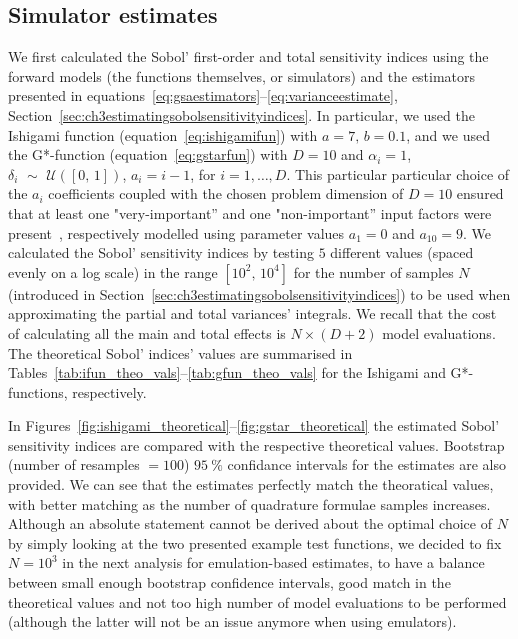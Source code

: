 \subsection{Simulator estimates}
We first calculated the Sobol' first-order and total sensitivity indices using the forward models (the functions themselves, or simulators) and the estimators presented in equations~\eqref{eq:gsaestimators}--\eqref{eq:varianceestimate}, Section~\ref{sec:ch3estimatingsobolsensitivityindices}. In particular, we used the Ishigami function (equation~\eqref{eq:ishigamifun}) with $a=7,\,b=0.1$, and we used the G*-function (equation~\eqref{eq:gstarfun}) with $D=10$ and $\alpha_i=1$, $\delta_i\,\,\sim\,\,\mathcal{U}([0,\,1])$, $a_i=i-1$, for $i=1,\dots,D$. This particular particular choice of the $a_i$ coefficients coupled with the chosen problem dimension of $D=10$ ensured that at least one "very-important'' and one "non-important'' input factors were present~\cite{Saltelli:2010,Marrel:2008}, respectively modelled using parameter values $a_1=0$ and $a_{10}=9$. We calculated the Sobol' sensitivity indices by testing $5$ different values (spaced evenly on a log scale) in the range $[10^2,\,10^4]$ for the number of samples $N$ (introduced in Section~\ref{sec:ch3estimatingsobolsensitivityindices}) to be used when approximating the partial and total variances' integrals. We recall that the cost of calculating all the main and total effects is $N\times(D+2)$ model evaluations. The theoretical Sobol' indices' values are summarised in Tables~\ref{tab:ifun_theo_vals}--\ref{tab:gfun_theo_vals} for the Ishigami and G*- functions, respectively.

\vspace{0.2cm}\noindent
In Figures~\ref{fig:ishigami_theoretical}--\ref{fig:gstar_theoretical} the estimated Sobol' sensitivity indices are compared with the respective theoretical values. Bootstrap (number of resamples $=100$) $\SI{95}{\percent}$ confidance intervals for the estimates are also provided. We can see that the estimates perfectly match the theoratical values, with better matching as the number of quadrature formulae samples increases. Although an absolute statement cannot be derived about the optimal choice of $N$ by simply looking at the two presented example test functions, we decided to fix $N=10^3$ in the next analysis for emulation-based estimates, to have a balance between small enough bootstrap confidence intervals, good match in the theoretical values and not too high number of model evaluations to be performed (although the latter will not be an issue anymore when using emulators).

